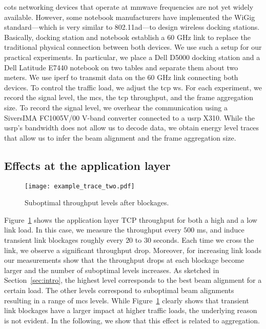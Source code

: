\documentclass{article}
\begin{document}
\ac{cots} networking devices that operate at \ac{mmwave} frequencies are not yet widely available. However, some notebook manufacturers have implemented the WiGig \cite{wigig_overview} standard---which is very similar to 802.11ad---to design wireless docking stations. Basically, docking station and notebook establish a 60 GHz link to replace the traditional physical connection between both devices. We use such a setup for our practical experiments. In particular, we place a Dell D5000 docking station and a Dell Latitude E7440 notebook on two tables and separate them about two meters. We use iperf to transmit data on the 60 GHz link connecting both devices. To control the traffic load, we adjust the \ac{tcp} \ac{ws}. For each experiment, we record the signal level, the \ac{mcs}, the \ac{tcp} throughput, and the frame aggregation size. To record the signal level, we overhear the communication using a SiversIMA FC1005V/00 V-band converter connected to a \ac{usrp} X310. While the \ac{usrp}'s bandwidth does not allow us to decode data, we obtain energy level traces that allow us to infer the beam alignment and the frame aggregation size.

\subsection{Effects at the application layer}
\label{subsec:appl_layer_effects}

\begin{figure}
	\centering
		\texttt{[image: example\_trace\_two.pdf]}
	\caption{Suboptimal throughput levels after blockages.}
	\label{fig:example_trace}
\end{figure}

Figure~\ref{fig:example_trace} shows the application layer TCP throughput for both a high and a low link load. In this case, we measure the throughput every $500$ ms, and induce transient link blockages roughly every $20$ to $30$ seconds. Each time we cross the link, we observe a significant throughput drop. Moreover, for increasing link loads our measurements show that the throughput drops at each blockage become larger and the number of suboptimal levels increases. As sketched in Section~\ref{sec:intro}, the highest level corresponds to the best beam alignment for a certain load. The other levels correspond to suboptimal beam alignments resulting in a range of \ac{mcs} levels. While Figure~\ref{fig:example_trace} clearly shows that transient link blockages have a larger impact at higher traffic loads, the underlying reason is not evident. In the following, we show that this effect is related to aggregation.
\end{document}
